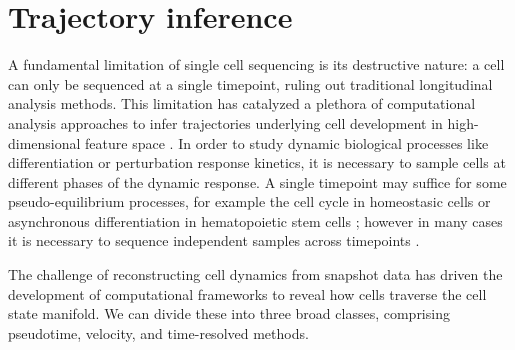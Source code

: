 %
%
%
%
%
\section{Trajectory inference}

A fundamental limitation of single cell sequencing is its destructive nature: a cell can only be sequenced at a single timepoint, ruling out traditional longitudinal analysis methods. This limitation has catalyzed a plethora of computational analysis approaches to infer trajectories underlying cell development in high-dimensional feature space \citep{saelensComparisonSinglecellTrajectory2019}. In order to study dynamic biological processes like differentiation or perturbation response kinetics, it is necessary to sample cells at different phases of the dynamic response. A single timepoint may suffice for some pseudo-equilibrium processes, for example the cell cycle in homeostasic cells \citep{stallaertStructureHumanCell2022} or asynchronous differentiation in hematopoietic stem cells \citep{macaulaySingleCellRNASequencingReveals2016, weinrebFundamentalLimitsDynamic2018}; however in many cases it is necessary to sequence independent samples across timepoints \citep{schiebingerOptimalTransportAnalysisSingleCell2019, kirschenbaumTimeresolvedSinglecellTranscriptomics2023}.

The challenge of reconstructing cell dynamics from snapshot data has driven the development of computational frameworks to reveal how cells traverse the cell state manifold. We can divide these into three broad classes, comprising pseudotime, velocity, and time-resolved methods.

